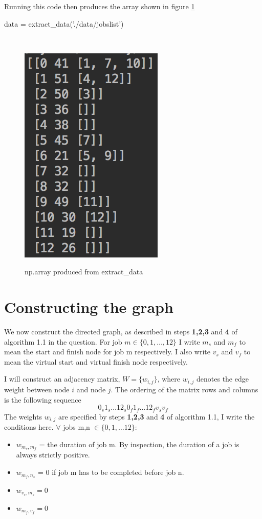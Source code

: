 \documentclass[paper=a4, fontsize=12pt]{scrartcl} %
\numberwithin{equation}{section}       %
\numberwithin{figure}{section}         %
\numberwithin{table}{section}          %
\begin{document}
Running this code then produces the array shown in figure \ref{data}
\begin{python}
data = extract_data('./data/jobslist')
\end{python}

\begin{figure}[t]\
\caption{np.array produced from extract\_data}
\centering
\includegraphics{data}\label{data}
\end{figure}

\section{Constructing the graph}
We now construct the directed graph, as described in steps \textbf{1,2,3} and \textbf{4} of algorithm 1.1 in the question. For job $m \in \{ 0,1,\dots, 12 \}$ I write $m_{s}$ and $m_{f}$ to mean the start and finish node for job m respectively. I also write $v_{s}$ and $v_{f}$ to mean the virtual start and virtual finish node respectively.

I will construct an adjacency matrix, $W = \{ w_{i,j} \}$, where $w_{i,j}$ denotes the edge weight between node $i$ and node $j$. The ordering of the matrix rows and columns is the following sequence $$ 0_{s} 1_{s} \dots 12_{s} 0_{f} 1_{f} \dots 12_{f} v_{s} v_{f}$$
The weights $w_{i,j}$ are specified by steps \textbf{1,2,3} and \textbf{4} of algorithm 1.1, I write the conditions here. $\forall$ jobs m,n $\in \{ 0,1,\dots 12\}$:
\begin{itemize}
  \item $w_{m_{s},m_{f}}$ = the duration of job m. By inspection, the duration of a job is always strictly positive.
  \item $w_{m_{f},n_{s}}$ = 0 if job m has to be completed before job n.
  \item $w_{v_{s},m_{s}} = 0$
  \item $w_{m_{f},v_{f}} = 0$
\end{itemize}
\end{document}
